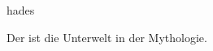 \documentclass{stex}
\begin{document}
\begin{smodule}[sig=en]{hades}
\begin{sparagraph}[style=symdoc]
Der  ist die Unterwelt in der
 Mythologie.
\end{sparagraph}
\end{smodule}
\end{document}
